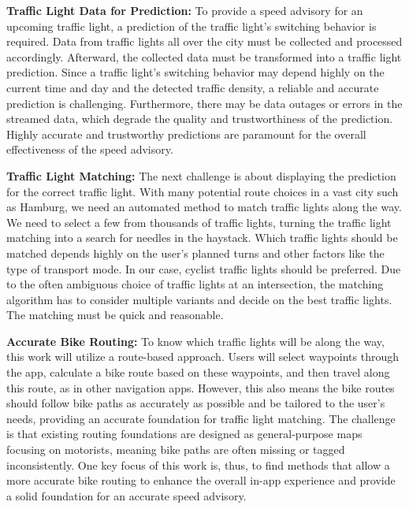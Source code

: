 \textbf{\color{cidarkblue}Traffic Light Data for Prediction:} To provide a speed advisory for an upcoming traffic light, a prediction of the traffic light's switching behavior is required. Data from traffic lights all over the city must be collected and processed accordingly. Afterward, the collected data must be transformed into a traffic light prediction. Since a traffic light's switching behavior may depend highly on the current time and day and the detected traffic density, a reliable and accurate prediction is challenging. Furthermore, there may be data outages or errors in the streamed data, which degrade the quality and trustworthiness of the prediction. Highly accurate and trustworthy predictions are paramount for the overall effectiveness of the speed advisory.

\textbf{\color{cidarkblue}Traffic Light Matching:} The next challenge is about displaying the prediction for the correct traffic light. With many potential route choices in a vast city such as Hamburg, we need an automated method to match traffic lights along the way. We need to select a few from thousands of traffic lights, turning the traffic light matching into a search for needles in the haystack. Which traffic lights should be matched depends highly on the user's planned turns and other factors like the type of transport mode. In our case, cyclist traffic lights should be preferred. Due to the often ambiguous choice of traffic lights at an intersection, the matching algorithm has to consider multiple variants and decide on the best traffic lights. The matching must be quick and reasonable.

\textbf{\color{cidarkblue}Accurate Bike Routing:} To know which traffic lights will be along the way, this work will utilize a route-based approach. Users will select waypoints through the app, calculate a bike route based on these waypoints, and then travel along this route, as in other navigation apps. However, this also means the bike routes should follow bike paths as accurately as possible and be tailored to the user's needs, providing an accurate foundation for traffic light matching. The challenge is that existing routing foundations are designed as general-purpose maps focusing on motorists, meaning bike paths are often missing or tagged inconsistently. One key focus of this work is, thus, to find methods that allow a more accurate bike routing to enhance the overall in-app experience and provide a solid foundation for an accurate speed advisory.

